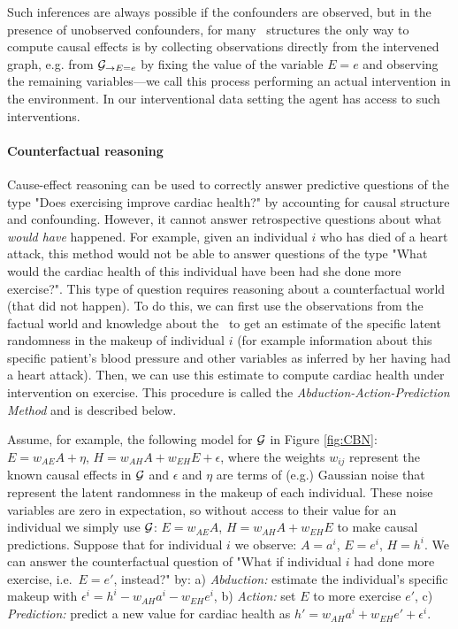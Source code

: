 Such inferences are always possible if the confounders are observed, but in the presence of unobserved confounders, for many \CBN~structures the only way to compute causal effects is by collecting observations directly from the intervened graph, e.g. from ${\cal G}_{\rightarrow E=e}$ by fixing the value of the variable $E=e$ and observing the remaining variables---we call this process performing an actual intervention in the environment. In our interventional data setting the agent has access to such interventions. 

\paragraph{Counterfactual reasoning}

Cause-effect reasoning can be used to correctly answer predictive questions of the type "Does exercising improve cardiac health?" by accounting for causal structure and confounding. However, it cannot answer retrospective questions about what \textit{would have} happened. For example, given an individual $i$ who has died of a heart attack, this method would not be able to answer questions of the type "What would the cardiac health of this individual have been had she done more exercise?". This type of question requires
reasoning about a counterfactual world (that did not happen). To do this, we can first use the observations from the factual world and knowledge about the \CBN~to get an estimate of the specific latent randomness in the makeup of individual $i$ (for example information about this specific patient's blood pressure and other variables as inferred by her having had a heart attack). Then, we can use this estimate to compute cardiac health under intervention on exercise. This procedure is called the \textit{Abduction-Action-Prediction Method} \cite{pearl16causal} and is described below.

Assume, for example, the following model for ${\cal G}$ in Figure \ref{fig:CBN}: $E=w_{AE}A + \eta$, $H=w_{AH}A+w_{EH}E+\epsilon$,
where the weights $w_{ij}$ represent the known causal effects in $\cal G$ and $\epsilon$ and $\eta$ are terms of (e.g.) Gaussian noise that represent the latent randomness in the makeup of each individual. These noise variables are zero in expectation, so without access to their value for an individual we simply use ${\cal G}$: $E=w_{AE}A$, $H=w_{AH}A+w_{EH}E$ to make causal predictions. Suppose that for individual $i$ we observe: $A = a^i$, $E = e^i$, $H = h^i$. We can answer the counterfactual question of "What if individual $i$ had done more exercise, i.e.~$E=e'$, instead?" by: a) \emph{Abduction:} estimate the individual's specific makeup with $\epsilon^i=h^i-w_{AH}a^i-w_{EH}e^i$, b) \emph{Action:} set $E$ to more exercise $e'$, c) \emph{Prediction:} predict a new value for cardiac health as $h'=w_{AH}a^i+w_{EH}e'+\epsilon^i$. 

